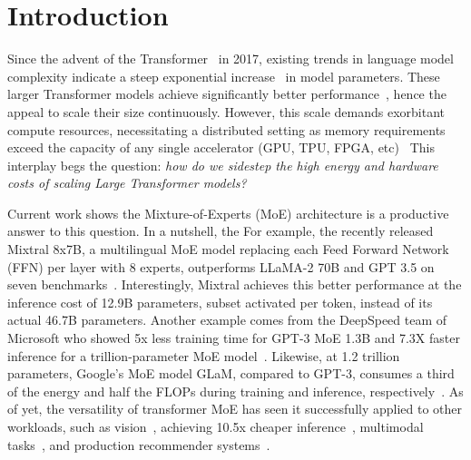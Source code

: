 \documentclass[acmsmall,screen,review,anonymous]{acmart}
\begin{document}


\received{\today}

\maketitle

\section{Introduction}\label{sec:introduction}
Since the advent of the Transformer~\cite{NEURIPS2017_3f5ee243} in 2017, existing trends in language model complexity
indicate a steep exponential increase~\cite{DBLP:journals/corr/abs-2201-11990} in model parameters.
These larger Transformer models achieve significantly better performance~\cite{DBLP:journals/corr/abs-2005-14165},
hence the appeal to scale their size continuously.
However, this scale demands exorbitant compute resources,
necessitating a distributed setting as memory requirements exceed the capacity of any
single accelerator (GPU, TPU, FPGA, etc)~\cite{DBLP:journals/corr/abs-2201-11990}
This interplay begs the question:
\emph{how do we sidestep the high energy and hardware costs of scaling Large Transformer models?}

Current work shows the Mixture-of-Experts (MoE) architecture is a productive answer to this question.
In a nutshell, the
For example, the recently released Mixtral 8x7B, a multilingual MoE model replacing each Feed Forward Network (FFN) per layer
with 8 experts, outperforms LLaMA-2 70B and GPT 3.5 on seven benchmarks~\cite{mixtral8x7B}.
Interestingly, Mixtral achieves this better performance at the inference cost of 12.9B parameters,
subset activated per token, instead of its actual 46.7B parameters.
Another example comes from the DeepSpeed team of Microsoft who showed 5x less training time for GPT-3 MoE 1.3B and
7.3X faster inference for a trillion-parameter MoE model~\cite{pmlr-v162-rajbhandari22a}.
Likewise, at 1.2 trillion parameters, Google's MoE model GLaM, compared to GPT-3,
consumes a third of the energy and half the FLOPs during training and inference, respectively~\cite{pmlr-v162-du22c}.
As of yet, the versatility of transformer MoE has seen it successfully applied to other workloads,
such as vision~\cite{NEURIPS2021_48237d9f}, achieving 10.5x cheaper inference~\cite{puigcerver2023sparse},
multimodal tasks~\cite{NEURIPS2022_3e67e84a}, and production recommender systems~\cite{DBLP:journals/corr/abs-2108-04690}.
\end{document}
